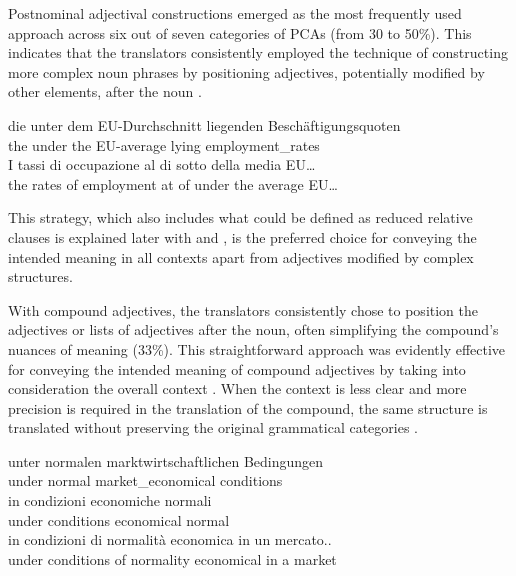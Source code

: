 \documentclass[output=paper,colorlinks,citecolor=brown]{langscibook}
\begin{document}
Postnominal adjectival constructions emerged as the most frequently used approach across six out of seven categories of PCAs (from 30 to 50\%). This indicates that the translators consistently employed the technique of constructing more complex noun phrases by positioning adjectives, potentially modified by other elements, after the noun .

\ea%
    \label{ex:resi:44}
\ea \gll die  unter  dem  EU-Durchschnitt  liegenden  Beschäftigungsquoten \\
   the  under  the  EU-average  lying  employment\_rates \\

\ex \gll     I  tassi di occupazione  al di sotto  della media  EU…  \\
       the rates of   employment at of  under  the average  EU…  \\
    \z
\z

This strategy, which also includes what could be defined as reduced relative clauses is explained later with  and , is the preferred choice for conveying the intended meaning in all contexts apart from adjectives modified by complex structures.

With compound adjectives, the translators consistently chose to position the adjectives or lists of adjectives after the noun, often simplifying the compound’s nuances of meaning (33\%). This straightforward approach was evidently effective for conveying the intended meaning of compound adjectives by taking into consideration the overall context . When the context is less clear and more precision is required in the translation of the compound, the same structure is translated without preserving the original grammatical categories .

\ea%
    \label{ex:resi:45}
\ea\label{ex:resi:45a}
\gll unter  normalen  marktwirtschaftlichen  Bedingungen \\
    under  normal  market\_economical  conditions   \\

\ex\label{ex:resi:45b}
   \gll  in  condizioni  economiche  normali\\
    under   conditions  economical  normal  \\

\ex\label{ex:resi:45c}
     \gll  in  condizioni  di  normalità   economica  in un mercato..\\
    under   conditions  of  normality  economical  in a market\\
  \z
\z
\end{document}
